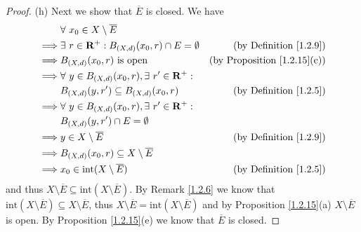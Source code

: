 \begin{proof}{(h)}
    Next we show that \(\overline{E}\) is closed.
    We have
    \begin{align*}
                 & \forall\ x_0 \in X \setminus \overline{E}                                                                     \\
        \implies & \exists\ r \in \mathbf{R}^+ : B_{(X, d)}(x_0, r) \cap E = \emptyset & \text{(by Definition \ref{1.2.9})}      \\
        \implies & B_{(X, d)}(x_0, r) \text{ is open}                                  & \text{(by Proposition \ref{1.2.15}(c))} \\
        \implies & \forall\ y \in B_{(X, d)}(x_0, r), \exists\ r' \in \mathbf{R}^+ :                                             \\
                 & B_{(X, d)}(y, r') \subseteq B_{(X, d)}(x_0, r)                      & \text{(by Definition \ref{1.2.5})}      \\
        \implies & \forall\ y \in B_{(X, d)}(x_0, r), \exists\ r' \in \mathbf{R}^+ :                                             \\
                 & B_{(X, d)}(y, r') \cap E = \emptyset                                                                          \\
        \implies & y \in X \setminus \overline{E}                                      & \text{(by Definition \ref{1.2.9})}      \\
        \implies & B_{(X, d)}(x_0, r) \subseteq X \setminus \overline{E}                                                         \\
        \implies & x_0 \in \text{int}(X \setminus \overline{E})                        & \text{(by Definition \ref{1.2.5})}
    \end{align*}
    and thus \(X \setminus \overline{E} \subseteq \text{int}(X \setminus \overline{E})\).
    By Remark \ref{1.2.6} we know that \(\text{int}(X \setminus \overline{E}) \subseteq X \setminus \overline{E}\), thus \(X \setminus \overline{E} = \text{int}(X \setminus \overline{E})\) and by Proposition \ref{1.2.15}(a) \(X \setminus \overline{E}\) is open.
    By Proposition \ref{1.2.15}(e) we know that \(\overline{E}\) is closed.


\end{proof}
